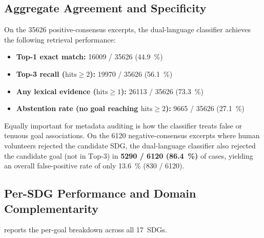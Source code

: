 \subsection{Aggregate Agreement and Specificity}

On the \num{35626} positive-consensus excerpts, the dual-language classifier achieves the following retrieval performance:
\begin{itemize}
  \item \textbf{Top-1 exact match:} \num{16009} / \num{35626} (\SI{44.9}{\percent})
  \item \textbf{Top-3 recall ($\text{hits} \ge 2$):} \num{19970} / \num{35626} (\SI{56.1}{\percent})
  \item \textbf{Any lexical evidence ($\text{hits} \ge 1$):} \num{26113} / \num{35626} (\SI{73.3}{\percent})
  \item \textbf{Abstention rate (no goal reaching $\text{hits} \ge 2$):} \num{9665} / \num{35626} (\SI{27.1}{\percent})
\end{itemize}

Equally important for metadata auditing is how the classifier treats false or tenuous goal associations. On the \num{6120} negative-consensus excerpts where human volunteers rejected the candidate \gls{SDG}, the dual-language classifier also rejected the candidate goal ($\text{not in Top-3}$) in \textbf{\num{5290} / \num{6120} (\SI{86.4}{\percent})} of cases, yielding an overall false-positive rate of only \SI{13.6}{\percent} (\num{830} / \num{6120}).

\subsection{Per-SDG Performance and Domain Complementarity}

 reports the per-goal breakdown across all 17~\glspl{SDG}.

